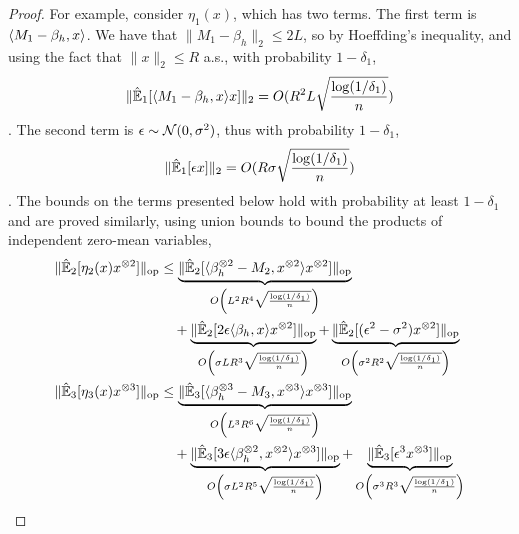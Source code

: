 \documentclass[tablecaption=bottom]{jmlr}
\newcommand\op{{\textrm{op}}}
\newcommand{\Lop}{\textrm{op}}
\begin{document}
\begin{proof}
For example, consider $\eta_1(x)$, which has two terms. 
The first term is $\langle M_1 - \beta_h, x \rangle$.  We have that $\|M_1 - \beta_h\|_2 \le 2L$, so by Hoeffding's inequality, and using the fact that $\|x\|_2 \le R$ a.s., with probability $1-\delta_1$, $$\|\hat{\operatorname{\mathbb{E}}}_1[\langle M_1 - \beta_h, x \rangle x]\|_2 = O(R^2 L \sqrt{\frac{\log(1/\delta_1)}{n}})$$. 
The second term is $\epsilon \sim \mathcal{N}(0, \sigma^2)$, thus with probability $1-\delta_1$, $$\|\hat{\operatorname{\mathbb{E}}}_1[\epsilon x]\|_2 = O(R \sigma \sqrt{\frac{\log(1/\delta_1)}{n}})$$. 
The bounds on the terms presented below hold with probability at least $1-\delta_1$ and are proved similarly, using union bounds to bound the products of independent zero-mean variables,
{
\begin{align*}
    \| \hat\E_2[ \eta_2(x) x\tp{2} ] \|_\Lop &\le 
            \underbrace{ \|\hat\E_2[\innerp{\beta_h\tp{2} - M_2}{x\tp{2}} x\tp{2}]\|_\op }_{ O\left( L^2 R^4      \sqrt{\frac{\log(1/\delta_1)}{n}} \right) } \\
   &\quad + \underbrace{ \|\hat\E_2[2 \epsilon \innerp{\beta_h}{x} x\tp{2}]\|_\op        }_{ O\left( \sigma L R^3 \sqrt{\frac{\log(1/\delta_1)}{n}} \right) } 
          + \underbrace{ \|\hat\E_2[(\epsilon^2 - \sigma^2) x\tp{2}]\|_\op               }_{ O\left( \sigma^2 R^2 \sqrt{\frac{\log(1/\delta_1)}{n}} \right) } \\
  \| \hat\E_3[ \eta_3(x) x\tp{3} ] \|_\Lop &\le 
            \underbrace{ \|\hat\E_3[\innerp{\beta_h\tp{3} - M_3}{x\tp{3}}                      x\tp{3}]\|_\op }_{O\left( L^3 R^6        \sqrt{\frac{\log(1/\delta_1)}{n}} \right) } \\
   &\quad + \underbrace{ \|\hat\E_3[3 \epsilon \innerp{\beta_h\tp{2}}{x\tp{2}}                 x\tp{3}]\|_\op }_{O\left( \sigma L^2 R^5 \sqrt{\frac{\log(1/\delta_1)}{n}} \right) } 
          + \underbrace{ \|\hat\E_3[\epsilon^3                                                 x\tp{3}]\|_\op }_{O\left( \sigma^3 R^3   \sqrt{\frac{\log (1/\delta_1)}{n}} \right) } \\

\end{align*}}
\end{proof}
\end{document}
